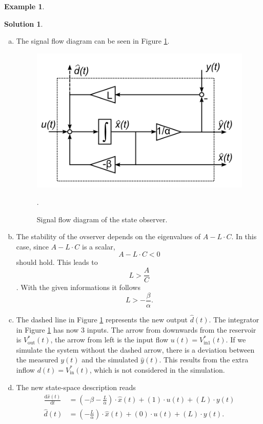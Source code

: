 \documentclass[a4paper,12 pt]{article}
\numberwithin{equation}{section}
\theoremstyle{definition}
\newtheorem{bsp}{Example}
\theoremstyle{remark}
\theoremstyle{definition}
\newtheorem*{lsg}{Solution}
\theoremstyle{definition}
\theoremstyle{definition}
\theoremstyle{remark}
\begin{document}
\begin{bsp}
\newpage


\begin{lsg}
\
\begin{enumerate}[(a)]
\item The signal flow diagram can be seen in Figure \ref{fig:res_2}.
\begin{figure}[h!]
\centering
\includegraphics[width=0.75\columnwidth]{reserv}
\caption{Signal flow diagram of the state observer.}
\label{fig:res_2}.
\end{figure}
\item The stability of the ovserver depends on the eigenvalues of $A-L\cdot C$. In this case, since $A-L\cdot C $ is a scalar, $$A-L\cdot C<0$$ should hold. This leads to $$L>\frac{A}{C}$$. With the given informations it follows
$$L>-\frac{\beta}{\alpha}.$$
\item The dashed line in Figure \ref{fig:res_2} represents the new output $\hat{d}(t)$. The integrator in Figure \ref{fig:res_2} has now 3 inputs. The arrow from downwards from the reservoir is $V_{\text{out}}^*(t)$, the arrow from left is the input flow $u(t)=V_{\text{in1}}^*(t)$. If we simulate the system without the dashed arrow, there is a deviation between the measured $y(t)$ and the simulated $\hat{y}(t)$. This results from the extra inflow $d(t)=V_{\text{in}}^*(t)$, which is not considered in the simulation. 
\item The new state-space description reads
\begin{align*}
\frac{\text{d}\hat{x}(t)}{\text{d}t}&= \left(-\beta -\frac{L}{\alpha}\right)\cdot \hat{x}(t)+ (1)\cdot u(t) +(L)\cdot y(t)\\
\hat{d}(t)&=\left( -\frac{L}{\alpha}\right) \cdot \hat{x}(t)+(0)\cdot u(t)+(L)\cdot y(t).
\end{align*}
 
\end{enumerate}

\end{lsg}

\end{bsp}
\end{document}
